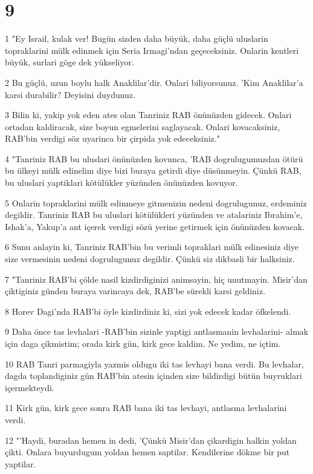 \chapter{9}

\par 1 "Ey Israil, kulak ver! Bugün sizden daha büyük, daha güçlü uluslarin topraklarini mülk edinmek için Seria Irmagi'ndan geçeceksiniz. Onlarin kentleri büyük, surlari göge dek yükseliyor.
\par 2 Bu güçlü, uzun boylu halk Anaklilar'dir. Onlari biliyorsunuz. 'Kim Anaklilar'a karsi durabilir? Deyisini duydunuz.
\par 3 Bilin ki, yakip yok eden ates olan Tanriniz RAB önünüzden gidecek. Onlari ortadan kaldiracak, size boyun egmelerini saglayacak. Onlari kovacaksiniz, RAB'bin verdigi söz uyarinca bir çirpida yok edeceksiniz."
\par 4 "Tanriniz RAB bu uluslari önünüzden kovunca, 'RAB dogrulugumuzdan ötürü bu ülkeyi mülk edinelim diye bizi buraya getirdi diye düsünmeyin. Çünkü RAB, bu uluslari yaptiklari kötülükler yüzünden önünüzden kovuyor.
\par 5 Onlarin topraklarini mülk edinmeye gitmenizin nedeni dogrulugunuz, erdeminiz degildir. Tanriniz RAB bu uluslari kötülükleri yüzünden ve atalariniz Ibrahim'e, Ishak'a, Yakup'a ant içerek verdigi sözü yerine getirmek için önünüzden kovacak.
\par 6 Sunu anlayin ki, Tanriniz RAB'bin bu verimli topraklari mülk edinesiniz diye size vermesinin nedeni dogrulugunuz degildir. Çünkü siz dikbasli bir halksiniz.
\par 7 "Tanriniz RAB'bi çölde nasil kizdirdiginizi animsayin, hiç unutmayin. Misir'dan çiktiginiz günden buraya varincaya dek, RAB'be sürekli karsi geldiniz.
\par 8 Horev Dagi'nda RAB'bi öyle kizdirdiniz ki, sizi yok edecek kadar öfkelendi.
\par 9 Daha önce tas levhalari -RAB'bin sizinle yaptigi antlasmanin levhalarini- almak için daga çikmistim; orada kirk gün, kirk gece kaldim. Ne yedim, ne içtim.
\par 10 RAB Tanri parmagiyla yazmis oldugu iki tas levhayi bana verdi. Bu levhalar, dagda toplandiginiz gün RAB'bin atesin içinden size bildirdigi bütün buyruklari içermekteydi.
\par 11 Kirk gün, kirk gece sonra RAB bana iki tas levhayi, antlasma levhalarini verdi.
\par 12 "'Haydi, buradan hemen in dedi, 'Çünkü Misir'dan çikardigin halkin yoldan çikti. Onlara buyurdugum yoldan hemen saptilar. Kendilerine dökme bir put yaptilar.
